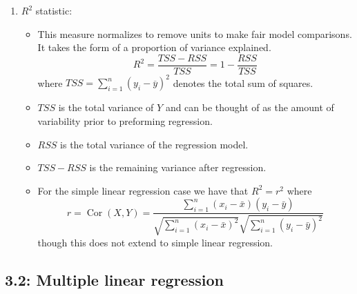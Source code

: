 \documentclass{article}
\begin{document}
\begin{enumerate}
\begin{enumerate}
\item $R^2$ statistic:
\begin{itemize}
\item This measure normalizes to remove units to make fair model comparisons. It takes the form of a proportion of variance explained.
\[
R^2 = \frac{TSS-RSS}{TSS} = 1 - \frac{RSS}{TSS}
\]
where $TSS=\sum_{i=1}^n (y_i-\overline{y})^2$ denotes the total sum of squares.
\item $TSS$ is the total variance of $Y$ and can be thought of as the amount of variability prior to preforming regression.
\item $RSS$ is the total variance of the regression model.
\item $TSS-RSS$ is the remaining variance after regression.
\item For the simple linear regression case we have that $R^2=r^2$ where
\[
r = \operatorname{Cor}(X, Y) = \frac{\sum_{i=1}^n (x_i - \bar{x})(y_i - \bar{y})}{\sqrt{\sum_{i=1}^n (x_i - \bar{x})^2} \sqrt{\sum_{i=1}^n (y_i - \bar{y})^2}}
\]
though this does not extend to simple linear regression.
\end{itemize}
\end{enumerate}

\end{enumerate}
\subsection*{3.2: Multiple linear regression}
\end{document}
